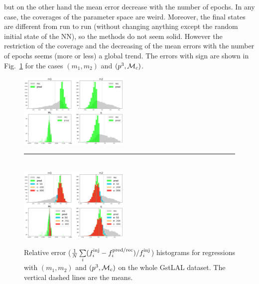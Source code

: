 \documentclass[prd,aps,twocolumn,a4paper,showkeys,nofootinbib]{revtex4-1}
\def\Mc{{\cal M}_c}
\begin{document}
but on the other hand the mean error decrease with the number of epochs. 
In any case, the coverages of the parameter space are weird. 
Moreover, the final states are different from run to run (without changing anything
except the random initial state of the NN), so the methods do
not seem solid. However the restriction of the coverage and the decreasing 
of the mean errors with the number of epochs seems (more or less) a global trend.  
The errors with sign are shown in Fig.~\ref{fig:errhisto} for the cases
$(m_1,m_2)$ and $(p^3, \Mc)$.
%
\begin{figure}[]
  \center
  \includegraphics[width=0.47\textwidth]{./Figs/errhisto_m1m2.png}
  \rule[1ex]{8cm}{0.5pt}\\
  \includegraphics[width=0.47\textwidth]{./Figs/errhisto_p3Mc.png}
  \caption{\label{fig:errhisto} Relative error
  ($\frac{1}{N} \sum\limits_i (f_i^{\rm inj} - f_i^{\rm pred/rec})/f_i^{\rm inj}$) 
  histograms for regressions with $(m_1,m_2)$ and 
  $(p^3, \Mc)$ on the whole GstLAL dataset. The vertical dashed lines are the means.}
\end{figure}
%
\end{document}
